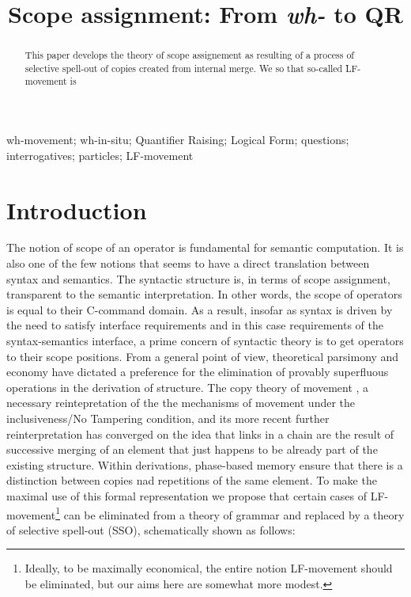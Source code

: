 \documentclass{glossa}
\title[Scope assignment]{Scope assignment: From \textit{wh-} to QR}
\author[Tsoulas \& Yeo]%
{%
  \spauthor{George Tsoulas\\
  \institute{University of York}\\
  \small{Heslington, York YO10 5DD, UK\\
  george.tsoulas@york.ac.uk}
  }
  \AND
  \spauthor{Norman Yeo\\
  \institute{University of York}\\
  \small{Heslington, York YO10 5DD, UK\\
  norman.yeo@york.ac.uk}
  }%
}
\begin{document}
\sffamily
\maketitle

\begin{abstract}
This paper develops the theory of scope assignement as resulting of a process of selective spell-out of copies created from internal merge.  We so that so-called LF-movement is 
\end{abstract}

\begin{keywords}

  wh-movement; wh-in-situ; Quantifier Raising; Logical Form; questions; interrogatives; particles; LF-movement

\end{keywords}


\rmfamily
\section{Introduction}
The notion of scope of an operator is fundamental for semantic computation. It is also one of the few notions that seems to have a direct translation between syntax and semantics. The syntactic structure is, in terms of scope assignment, transparent to the semantic interpretation.  In other words, the scope of operators is equal to their C-command domain.  As a result, insofar as syntax is driven by the need to satisfy interface requirements and in this case requirements of the syntax-semantics interface, a prime concern of syntactic theory is to get operators to their scope positions. From a general point of view, theoretical parsimony and economy have dictated a preference for the elimination of provably superfluous operations in the derivation of structure. The copy theory of movement \citep{chomsky:1993}, a necessary reintepretation of the the mechanisms of movement under the inclusiveness/No Tampering condition, and its more recent further reinterpretation has converged on the idea that links in a chain are the result of successive merging of an element that just happens to be already part of the existing structure. Within derivations, phase-based memory ensure that there is a distinction between copies nad repetitions of the same element. To make the maximal use of this formal representation we propose that certain cases of LF-movement\footnote{Ideally, to be maximally economical, the entire notion LF-movement should be eliminated, but our aims here are somewhat more modest.} can be eliminated from a theory of grammar and replaced by a theory of selective spell-out (SSO), schematically shown as follows:
\end{document}
